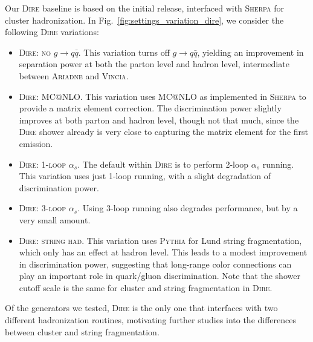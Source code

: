 \documentclass[11pt,letterpaper]{article}
\DeclareRobustCommand{\Fig}[1]{Fig.~\ref{#1}}
\begin{document}
Our \textsc{Dire} baseline is based on the initial release, interfaced with \textsc{Sherpa} for cluster hadronization.  In \Fig{fig:settings_variation_dire}, we consider the following \textsc{Dire} variations:
\begin{itemize}
\item \textsc{Dire:  no $g \to q\bar{q}$}.  This variation turns off $g \to q \bar{q}$, yielding an improvement in separation power at both the parton level and hadron level, intermediate between \textsc{Ariadne} and \textsc{Vincia}.
\item \textsc{Dire: MC@NLO}.  This variation uses MC@NLO \cite{Frixione:2002ik} as implemented in \textsc{Sherpa} to provide a matrix element correction.  The discrimination power slightly improves at both parton and hadron level, though not that much, since the \textsc{Dire} shower already is very close to capturing the matrix element for the first emission.
\item \textsc{Dire: 1-loop $\alpha_s$}.  The default within \textsc{Dire} is to perform 2-loop $\alpha_s$ running.  This variation uses just 1-loop running, with a slight degradation of discrimination power.
\item \textsc{Dire: 3-loop $\alpha_s$}.  Using 3-loop running also degrades performance, but by a very small amount.
\item \textsc{Dire: string had}.  This variation uses \textsc{Pythia} for Lund string fragmentation, which only has an effect at hadron level.  This leads to a modest improvement in discrimination power, suggesting that long-range color connections can play an important role in quark/gluon discrimination.  Note that the shower cutoff scale is the same for cluster and string fragmentation in \textsc{Dire}.
\end{itemize}
Of the generators we tested, \textsc{Dire} is the only one that interfaces with two different hadronization routines, motivating further studies into the differences between cluster and string fragmentation.
\end{document}
